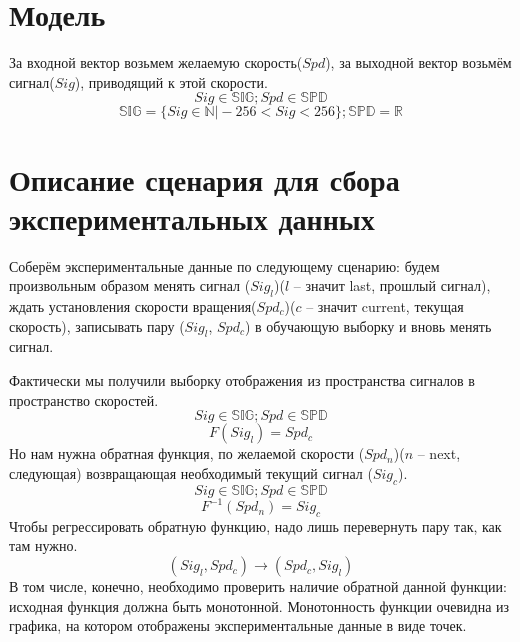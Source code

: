 \documentclass[14pt]{extreport}
\begin{document}
            \section{Модель}
                За входной вектор возьмем желаемую скорость($Spd$), за выходной вектор возьмём сигнал($Sig$), приводящий к этой скорости.
                \[Sig \in \mathbb{SIG}; Spd \in \mathbb{SPD}\]
                \[\mathbb{SIG} = \{Sig \in \mathbb{N}\vert -256 < Sig < 256\}; \mathbb{SPD} = \mathbb{R}\]
            \section{Описание сценария для сбора экспериментальных данных}
                Соберём экспериментальные данные по следующему сценарию: будем произвольным образом менять сигнал ($Sig_l$)($l$ -- значит last, прошлый сигнал), ждать установления скорости вращения($Spd_c$)($c$ -- значит current, текущая скорость), записывать пару ($Sig_l$, $Spd_c$) в обучающую выборку и вновь менять сигнал.

                Фактически мы получили выборку отображения из пространства сигналов в пространство скоростей.
                \[Sig \in \mathbb{SIG}; Spd \in \mathbb{SPD}\]
                \[F(Sig_l) = Spd_c\]
                Но нам нужна обратная функция, по желаемой скорости ($Spd_n$)($n$ -- next, следующая) возвращающая необходимый текущий сигнал ($Sig_c$).
                \[Sig \in \mathbb{SIG}; Spd \in \mathbb{SPD}\]
                \[F^{-1}(Spd_n) = Sig_c\]
                Чтобы регрессировать обратную функцию, надо лишь перевернуть пару так, как там нужно.
                \[(Sig_l, Spd_c) \rightarrow (Spd_c, Sig_l)\]
                В том числе, конечно, необходимо проверить наличие обратной данной функции: исходная функция должна быть монотонной. Монотонность функции очевидна из графика, на котором отображены экспериментальные данные в виде точек.
                
\end{document}
